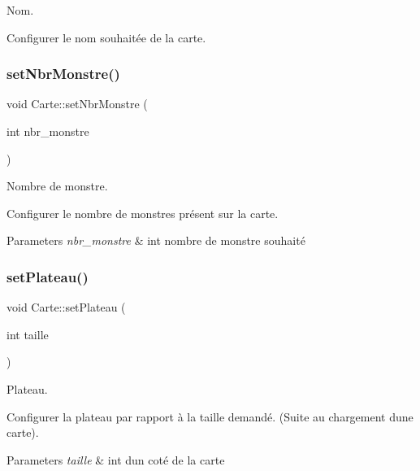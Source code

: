 Nom. 

Configurer le nom souhaitée de la carte. \mbox{\label{class_carte_ae05165c486b5bc7645dc1e98b10ee395}} 
\subsubsection{\texorpdfstring{set\+Nbr\+Monstre()}{setNbrMonstre()}}
{\footnotesize\ttfamily void Carte\+::set\+Nbr\+Monstre (\begin{DoxyParamCaption}\item[{int}]{nbr\+\_\+monstre }\end{DoxyParamCaption})}



Nombre de monstre. 

Configurer le nombre de monstres présent sur la carte.


\begin{DoxyParams}{Parameters}
{\em nbr\+\_\+monstre} & int nombre de monstre souhaité \\
\hline
\end{DoxyParams}
\mbox{\label{class_carte_ae9928759af0c0a63eb93039ec0d053b4}} 
\subsubsection{\texorpdfstring{set\+Plateau()}{setPlateau()}}
{\footnotesize\ttfamily void Carte\+::set\+Plateau (\begin{DoxyParamCaption}\item[{int}]{taille }\end{DoxyParamCaption})}



Plateau. 

Configurer la plateau par rapport à la taille demandé. (Suite au chargement d\textquotesingle{}une carte).


\begin{DoxyParams}{Parameters}
{\em taille} & int d\textquotesingle{}un coté de la carte \\
\hline
\end{DoxyParams}
\mbox{\label{class_carte_ad7df9b5a827971f5c0036b5b1ffed5a4}} 
